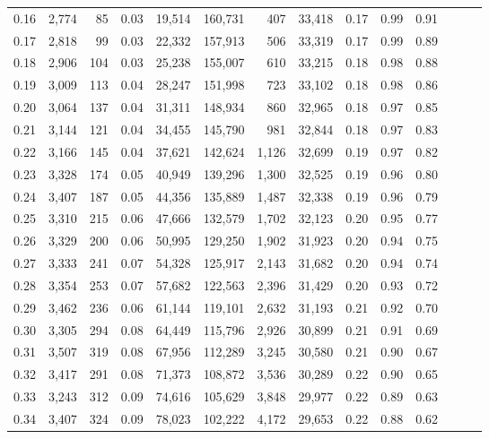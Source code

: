 \begin{tabular}{rrrrrrrrrrrrrr}
0.16 &  2,774 &   85 &  0.03 &   19,514 &  160,731 &     407 &  33,418 &  0.17 &  0.99 &      0.91 \\
0.17 &  2,818 &   99 &  0.03 &   22,332 &  157,913 &     506 &  33,319 &  0.17 &  0.99 &      0.89 \\
0.18 &  2,906 &  104 &  0.03 &   25,238 &  155,007 &     610 &  33,215 &  0.18 &  0.98 &      0.88 \\
0.19 &  3,009 &  113 &  0.04 &   28,247 &  151,998 &     723 &  33,102 &  0.18 &  0.98 &      0.86 \\
0.20 &  3,064 &  137 &  0.04 &   31,311 &  148,934 &     860 &  32,965 &  0.18 &  0.97 &      0.85 \\
0.21 &  3,144 &  121 &  0.04 &   34,455 &  145,790 &     981 &  32,844 &  0.18 &  0.97 &      0.83 \\
0.22 &  3,166 &  145 &  0.04 &   37,621 &  142,624 &   1,126 &  32,699 &  0.19 &  0.97 &      0.82 \\
0.23 &  3,328 &  174 &  0.05 &   40,949 &  139,296 &   1,300 &  32,525 &  0.19 &  0.96 &      0.80 \\
0.24 &  3,407 &  187 &  0.05 &   44,356 &  135,889 &   1,487 &  32,338 &  0.19 &  0.96 &      0.79 \\
0.25 &  3,310 &  215 &  0.06 &   47,666 &  132,579 &   1,702 &  32,123 &  0.20 &  0.95 &      0.77 \\
0.26 &  3,329 &  200 &  0.06 &   50,995 &  129,250 &   1,902 &  31,923 &  0.20 &  0.94 &      0.75 \\
0.27 &  3,333 &  241 &  0.07 &   54,328 &  125,917 &   2,143 &  31,682 &  0.20 &  0.94 &      0.74 \\
0.28 &  3,354 &  253 &  0.07 &   57,682 &  122,563 &   2,396 &  31,429 &  0.20 &  0.93 &      0.72 \\
0.29 &  3,462 &  236 &  0.06 &   61,144 &  119,101 &   2,632 &  31,193 &  0.21 &  0.92 &      0.70 \\
0.30 &  3,305 &  294 &  0.08 &   64,449 &  115,796 &   2,926 &  30,899 &  0.21 &  0.91 &      0.69 \\
0.31 &  3,507 &  319 &  0.08 &   67,956 &  112,289 &   3,245 &  30,580 &  0.21 &  0.90 &      0.67 \\
0.32 &  3,417 &  291 &  0.08 &   71,373 &  108,872 &   3,536 &  30,289 &  0.22 &  0.90 &      0.65 \\
0.33 &  3,243 &  312 &  0.09 &   74,616 &  105,629 &   3,848 &  29,977 &  0.22 &  0.89 &      0.63 \\
0.34 &  3,407 &  324 &  0.09 &   78,023 &  102,222 &   4,172 &  29,653 &  0.22 &  0.88 &      0.62 \\

\end{tabular}
